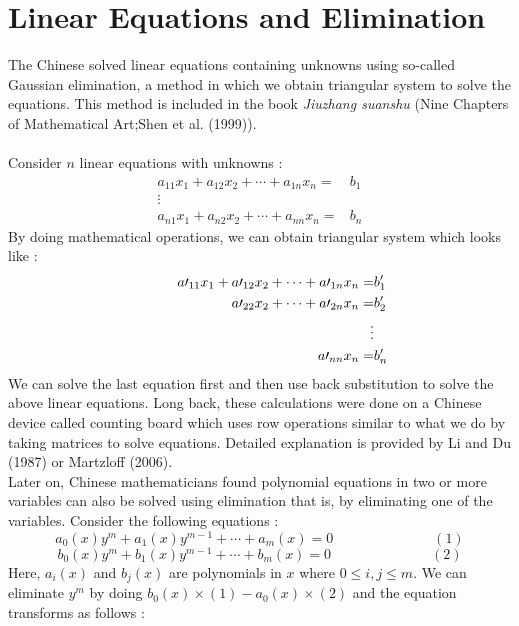 \documentclass[a4paper,reqno,11pt]{book}
\theoremstyle{plain}%
\theoremstyle{definition}
\begin{document}
\section{Linear Equations and Elimination}
The Chinese solved linear equations containing unknowns using so-called Gaussian elimination, a method in which we obtain triangular system to solve the equations. This method is included in the book \textit{Jiuzhang suanshu} (Nine Chapters of Mathematical Art;Shen et al. (1999)).\\
\\
Consider $n$ linear equations with unknowns :\\
\begin{align*}
a_{11}x_{1} + a_{12}x_{2} + \cdots + a_{1n}x_{n} =& b_{1}\\
\vdots&\\
a_{n1}x_{1} + a_{n2}x_{2} + \cdots + a_{nn}x_{n} =& b_{n}
\end{align*}
By doing mathematical operations, we can obtain triangular system which looks like :\\
\begin{align*}
a\prime_{11}x_{1} + a\prime_{12}x_{2} + \cdots + a\prime_{1n}x_{n} =& b'_{1}\\
\indent \hspace{2cm} a\prime_{22}x_{2} + \cdots + a\prime_{2n}x_{n} =& b'_{2}\\
\vdots&\\
a\prime_{nn}x_{n} =& b'_{n}\\
\end{align*}
We can solve the last equation first and then use back substitution to solve the above linear equations. Long back, these calculations were done on a Chinese device called counting board which uses row operations similar to what we do by taking matrices to solve equations. Detailed explanation is provided by Li and Du (1987) or Martzloff (2006).\\
Later on, Chinese mathematicians found polynomial equations in two or
more variables can also be solved using elimination that is, by eliminating one of the variables. Consider the following equations :\\
$$a_{0}(x)y^m + a_{1}(x)y^{m-1} + \cdots + a_{m}(x) = 0 \hspace{3cm} (1)$$
$$b_{0}(x)y^m + b_{1}(x)y^{m-1} + \cdots + b_{m}(x) = 0 \hspace{3cm} (2)$$
Here, $a_{i}(x)$ and $b_{j}(x)$ are polynomials in $x$ where $0 \leq i,j \leq m.$ We can eliminate $y^m$ by doing $b_{0}(x) \times (1) - a_{0}(x) \times (2)$ and the equation transforms as follows :
\end{document}

